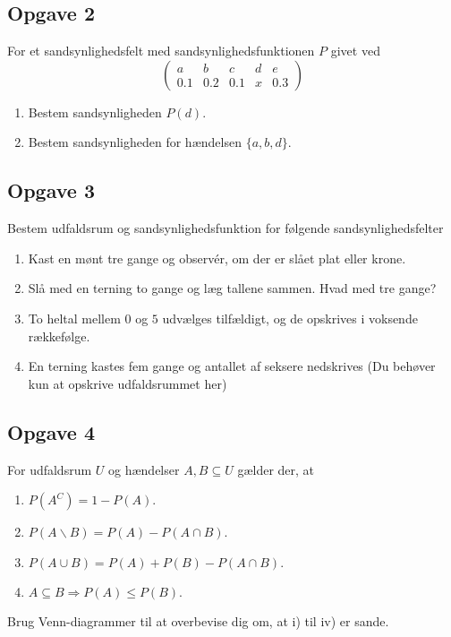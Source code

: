 \subsection*{Opgave 2}
For et sandsynlighedsfelt med sandsynlighedsfunktionen $P$ givet ved
$$
	\begin{pmatrix}
		a & b & c & d & e \\
		0.1 & 0.2 & 0.1 & x & 0.3 
	\end{pmatrix}
$$
\begin{enumerate}[label=\roman*)]
	\item Bestem sandsynligheden $P(d)$. 
	\item Bestem sandsynligheden for hændelsen $\{a,b,d\}$. 
\end{enumerate}

\subsection*{Opgave 3}
Bestem udfaldsrum og sandsynlighedsfunktion for følgende sandsynlighedsfelter
\begin{enumerate}[label=\roman*)]
\item Kast en mønt tre gange og observér, om der er slået plat eller krone. 
\item Slå med en terning to gange og læg tallene sammen. Hvad med tre gange?
\item To heltal mellem $0$ og $5$ udvælges tilfældigt, og de opskrives i voksende rækkefølge.
\item En terning kastes fem gange og antallet af seksere nedskrives (Du behøver kun at opskrive udfaldsrummet her)
\end{enumerate}
\subsection*{Opgave 4}
For udfaldsrum $U$ og hændelser $A,B\subseteq U$ gælder der, at 
\begin{enumerate}[label=\roman*)]
\item $P(A^C) = 1-P(A)$.
\item $P(A \backslash B) = P(A) - P(A\cap B)$.
\item $P(A\cup B) = P(A)+P(B)-P(A\cap B)$.
\item $A\subseteq B \Rightarrow P(A)\leq P(B).$ 
\end{enumerate}
Brug Venn-diagrammer til at overbevise dig om, at i) til iv) er sande.

